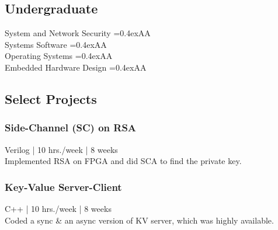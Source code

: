 \documentclass[]{deedy}
\newcommand{\linkstyle}[1]{\textbf{\ul{#1}}}
\newcommand{\grade}[1]{{\fboxsep=0.4ex\colorbox{light-gray}{\small{{#1}}}}}
\let\oldhref\href
\renewcommand{\href}[2]{%
\oldhref{#1}{\linkstyle{#2}}%
}
\begin{document}
\begin{minipage}[t]{0.33\textwidth}
\subsection{Undergraduate}
System and Network Security \grade{AA}\\
Systems Software \grade{AA}\\
Operating Systems \grade{AA}\\
Embedded Hardware Design \grade{AA}\\
\sectionsep


\subsection{Select Projects}
\subsubsection*{Side-Channel (SC) on RSA}
{\small Verilog | 10 hrs./week | 8 weeks}\\[1ex]
Implemented RSA on FPGA and did SCA to find the private key.\\[1.5ex]

\subsubsection*{Key-Value Server-Client}
{\small C++ | 10 hrs./week | 8 weeks}\\[1ex]
Coded a sync \& an async version of KV server, which was highly available.

%


\end{minipage}
\end{document}
